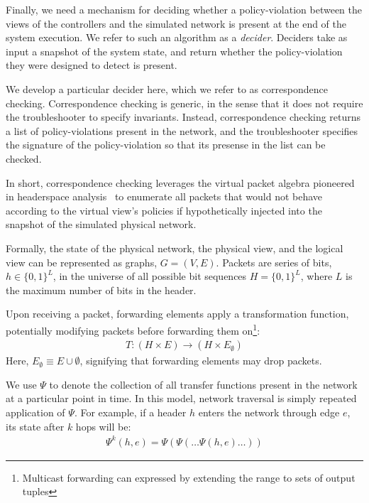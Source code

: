 Finally, we need a mechanism for deciding
whether a policy-violation between the views of the controllers and the simulated network
is present at the end of the system execution.
We refer to such an algorithm as a {\em decider}. Deciders take as input a
snapshot of the system state, and return whether the
policy-violation they were designed to detect is present.

We develop a particular decider here, which we refer to as correspondence checking.
Correspondence checking is generic, in the sense that it does not require
the troubleshooter to specify invariants. Instead, correspondence checking returns a list
of policy-violations present in the network, and the troubleshooter specifies the signature of the
policy-violation so that its presense in the list can be checked.

In short, correspondence checking leverages the virtual packet algebra
pioneered in headerspace analysis~\cite{hsa} to enumerate all packets
that would not behave according to the virtual view's policies if
hypothetically injected into the snapshot of the simulated physical network.


Formally, the state of the physical network, the physical view, and the
logical view can be represented as graphs,
$G = (V, E)$. Packets are series of bits, $h \in \{0,1\}^L$, in the universe
of all possible bit sequences $H = \{0,1\}^L$,
where $L$ is the maximum number of bits in the header.

Upon receiving a packet,
forwarding elements apply a transformation function, potentially modifying
packets before forwarding them on\footnote{Multicast forwarding can expressed
by extending the range to sets of output tuples}:
\begin{align*}
T: (H \times E) \rightarrow (H \times E_{\emptyset})
\end{align*}
Here, $E_{\emptyset} \equiv E \cup \emptyset$, signifying that forwarding elements
may drop packets.

We use $\Psi$ to denote the collection of all transfer functions present in
the network at a particular point in time. In this model, network traversal is
simply repeated application of $\Psi$.
For example, if a header $h$ enters the network through edge
$e$, its state after $k$ hops will be:
\begin{align*}
\Psi^k(h,e) = \Psi(\Psi(\dots \Psi(h,e)\dots))
\end{align*}

